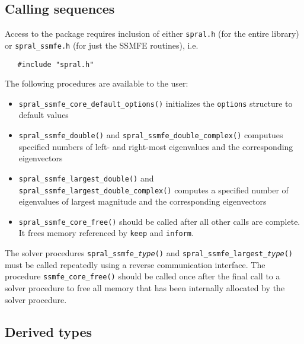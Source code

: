 \subsection{Calling sequences}

Access to the package requires inclusion of either \texttt{spral.h} (for the
entire \spral library) or \texttt{spral\_ssmfe.h} (for just the SSMFE routines), i.e.

\begin{verbatim}
   #include "spral.h"
\end{verbatim}

\noindent The following procedures are available to the user:
%
\vspace{-0.1cm}
\begin{itemize}
\item {\tt spral\_ssmfe\_core\_default\_options()} initializes the \texttt{options} structure to default values
\item {\tt spral\_ssmfe\_double()} and {\tt spral\_ssmfe\_double\_complex()}
computues specified numbers of left- and right-most
eigenvalues and the corresponding eigen\-vec\-tors
\item {\tt spral\_ssmfe\_largest\_double()} and
{\tt spral\_ssmfe\_largest\_double\_complex()}
computes a specified number
of eigenvalues of largest magnitude
and the cor\-res\-pon\-ding eigenvectors
\item {\tt spral\_ssmfe\_core\_free()} should be called after all other calls
are complete. It frees memory referenced by \texttt{keep} and \texttt{inform}.
\end{itemize}

\noindent
The solver procedures \texttt{spral\_ssmfe\_\textit{type}()} and \texttt{spral\_ssmfe\_largest\_\textit{type}()}
must be called repeatedly using
a reverse communication interface.
The procedure \texttt{ssmfe\_core\_free()}
should be called once after the
final call to 
a solver procedure
to free all memory that has been internally
allocated by
the solver procedure.

\subsection{Derived types}

